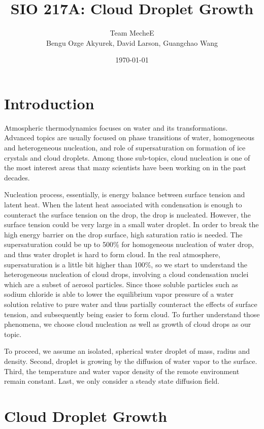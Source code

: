 \documentclass[titlepage]{article}
\title{SIO 217A: Cloud Droplet Growth}
\author{Team MecheE \\ Bengu Ozge Akyurek, David Larson, Guangchao Wang}
\date{\today}
\begin{document}
\maketitle


\section{Introduction}
Atmospheric thermodynamics focuses on water and its transformations. Advanced
topics are usually focused on phase transitions of water, homogeneous and
heterogeneous nucleation, and role of supersaturation on formation of ice
crystals and cloud droplets. Among those sub-topics, cloud nucleation is one of
the most interest areas that many scientists have been working on in the past
decades.

Nucleation process, essentially, is energy balance between surface tension and
latent heat. When the latent heat associated with condensation is enough to
counteract the surface tension on the drop, the drop is nucleated. However, the
surface tension could be very large in a small water droplet. In order to break
the high energy barrier on the drop surface, high saturation ratio is needed.
The supersaturation could be up to 500\% for homogeneous nucleation of water
drop, and thus water droplet is hard to form cloud. In the real atmosphere,
supersaturation is a little bit higher than 100\%, so we start to understand
the heterogeneous nucleation of cloud drops, involving a cloud condensation
nuclei which are a subset of aerosol particles. Since those soluble particles
such as sodium chloride is able to lower the equilibrium vapor pressure of a
water solution relative to pure water and thus partially counteract the effects
of surface tension, and subsequently being easier to form cloud. To further
understand those phenomena, we choose cloud nucleation as well as growth of
cloud drops as our topic.

To proceed, we assume an isolated, spherical water droplet of mass, radius and
density. Second, droplet is growing by the diffusion of water vapor to the
surface. Third, the temperature and water vapor density of the remote
environment remain constant. Last, we only consider a steady state diffusion
field.


\section{Cloud Droplet Growth}
\end{document}
